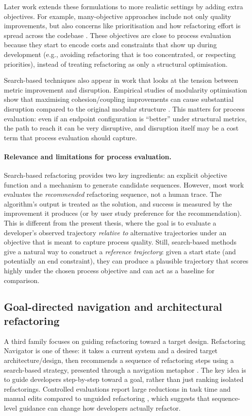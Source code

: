Later work extends these formulations to more realistic settings by adding extra objectives. For example, many-objective approaches include not only quality improvements, but also concerns like prioritisation and how refactoring effort is spread across the codebase \cite{mohan2019manyobjective}. These objectives are close to process evaluation because they start to encode costs and constraints that show up during development (e.g., avoiding refactoring that is too concentrated, or respecting priorities), instead of treating refactoring as only a structural optimisation.

Search-based techniques also appear in work that looks at the tension between metric improvement and disruption. Empirical studies of modularity optimisation show that maximising cohesion/coupling improvements can cause substantial disruption compared to the original modular structure \cite{paixao2017balancing}. This matters for process evaluation: even if an endpoint configuration is ``better'' under structural metrics, the path to reach it can be very disruptive, and disruption itself may be a cost term that process evaluation should capture.

\paragraph{Relevance and limitations for process evaluation.}
Search-based refactoring provides two key ingredients: an explicit objective function and a mechanism to generate candidate sequences. However, most work evaluates the \emph{recommended} refactoring sequence, not a human trace. The algorithm's output is treated as the solution, and success is measured by the improvement it produces (or by user study preference for the recommendation). This is different from the present thesis, where the goal is to evaluate a developer's observed trajectory \emph{relative to} alternative trajectories under an objective that is meant to capture process quality. Still, search-based methods give a natural way to construct a \emph{reference trajectory}: given a start state (and potentially an end constraint), they can produce a plausible trajectory that scores highly under the chosen process objective and can act as a baseline for comparison.

\subsection{Goal-directed navigation and architectural refactoring}
A third family focuses on guiding refactoring toward a target design. Refactoring Navigator is one of these: it takes a current system and a desired target architecture/design, then recommends a sequence of refactoring steps using a search-based strategy, presented through a navigation metaphor \cite{lin2016navigator}. The key idea is to guide developers step-by-step toward a goal, rather than just ranking isolated refactorings. Controlled evaluations report large reductions in task time and manual edits compared to unguided refactoring \cite{lin2016navigator}, which suggests that sequence-level guidance can change how developers actually refactor.

